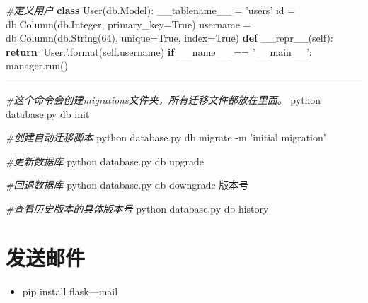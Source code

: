 \documentclass[11pt]{article}
\providecommand{\tightlist}{%
      \setlength{\itemsep}{0pt}\setlength{\parskip}{0pt}}
\newenvironment{Shaded}{}{}
\newcommand{\KeywordTok}[1]{\textcolor[rgb]{0.00,0.44,0.13}{\textbf{{#1}}}}
\newcommand{\DecValTok}[1]{\textcolor[rgb]{0.25,0.63,0.44}{{#1}}}
\newcommand{\StringTok}[1]{\textcolor[rgb]{0.25,0.44,0.63}{{#1}}}
\newcommand{\CommentTok}[1]{\textcolor[rgb]{0.38,0.63,0.69}{\textit{{#1}}}}
\newcommand{\FunctionTok}[1]{\textcolor[rgb]{0.02,0.16,0.49}{{#1}}}
\newcommand{\NormalTok}[1]{{#1}}
\newcommand{\VariableTok}[1]{\textcolor[rgb]{0.10,0.09,0.49}{{#1}}}
\newcommand{\ControlFlowTok}[1]{\textcolor[rgb]{0.00,0.44,0.13}{\textbf{{#1}}}}
\newcommand{\OperatorTok}[1]{\textcolor[rgb]{0.40,0.40,0.40}{{#1}}}
\newcommand{\BuiltInTok}[1]{{#1}}
\newcommand{\ExtensionTok}[1]{{#1}}
\begin{document}
\begin{Shaded}
\begin{Highlighting}[]
\CommentTok{#定义用户}
\KeywordTok{class}\NormalTok{ User(db.Model):}
\NormalTok{    __tablename__ }\OperatorTok{=} \StringTok{'users'}
    \BuiltInTok{id} \OperatorTok{=}\NormalTok{ db.Column(db.Integer, primary_key}\OperatorTok{=}\VariableTok{True}\NormalTok{)}
\NormalTok{    username }\OperatorTok{=}\NormalTok{ db.Column(db.String(}\DecValTok{64}\NormalTok{), unique}\OperatorTok{=}\VariableTok{True}\NormalTok{, index}\OperatorTok{=}\VariableTok{True}\NormalTok{)}
    \KeywordTok{def} \FunctionTok{__repr__}\NormalTok{(}\VariableTok{self}\NormalTok{):}
        \ControlFlowTok{return} \StringTok{'User:'}\NormalTok{.}\BuiltInTok{format}\NormalTok{(}\VariableTok{self}\NormalTok{.username)}
\ControlFlowTok{if} \VariableTok{__name__} \OperatorTok{==} \StringTok{'__main__'}\NormalTok{:}
\NormalTok{    manager.run()}
\end{Highlighting}
\end{Shaded}

\begin{center}\rule{0.5\linewidth}{\linethickness}\end{center}

\begin{Shaded}
\begin{Highlighting}[]
\CommentTok{#这个命令会创建migrations文件夹，所有迁移文件都放在里面。}
\ExtensionTok{python}\NormalTok{ database.py db init}

\CommentTok{#创建自动迁移脚本}
\ExtensionTok{python}\NormalTok{ database.py db migrate -m }\StringTok{'initial migration'}

\CommentTok{#更新数据库}
\ExtensionTok{python}\NormalTok{ database.py db upgrade}

\CommentTok{#回退数据库}
\ExtensionTok{python}\NormalTok{ database.py db downgrade 版本号}

\CommentTok{#查看历史版本的具体版本号}
\ExtensionTok{python}\NormalTok{ database.py db history}
\end{Highlighting}
\end{Shaded}

    \hypertarget{ux53d1ux9001ux90aeux4ef6}{%
\section{发送邮件}\label{ux53d1ux9001ux90aeux4ef6}}

\begin{itemize}
\tightlist
\item
  pip install flask---mail
\end{itemize}
\end{document}
